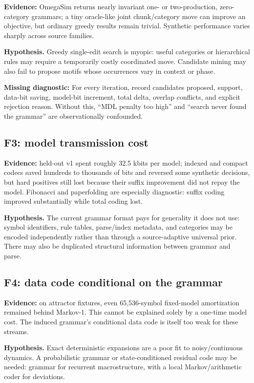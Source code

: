 \documentclass[10pt]{article}
\newcommand{\hyp}{\textbf{Hypothesis.}}
\begin{document}
\textbf{Evidence:} OmegaSim returns nearly invariant one- or two-production,
zero-category grammars; a tiny oracle-like joint chunk/category move can
improve an objective, but ordinary greedy results remain trivial. Synthetic
performance varies sharply across source families.

\hyp{} Greedy single-edit search is myopic: useful categories or hierarchical
rules may require a temporarily costly coordinated move. Candidate mining may
also fail to propose motifs whose occurrences vary in context or phase.

\textbf{Missing diagnostic:} For every iteration, record candidates proposed,
support, data-bit saving, model-bit increment, total delta, overlap conflicts,
and explicit rejection reason. Without this, ``MDL penalty too high'' and
``search never found the grammar'' are observationally confounded.

\subsection{F3: model transmission cost}

\textbf{Evidence:} held-out v1 spent roughly 32.5 kbits per model; indexed and
compact codecs saved hundreds to thousands of bits and reversed some synthetic
decisions, but hard positives still lost because their suffix improvement did
not repay the model. Fibonacci and paperfolding are especially diagnostic:
suffix coding improved substantially while total coding lost.

\hyp{} The current grammar format pays for generality it does not use:
symbol identifiers, rule tables, parse/index metadata, and categories may be
encoded independently rather than through a source-adaptive universal prior.
There may also be duplicated structural information between grammar and parse.

\subsection{F4: data code conditional on the grammar}

\textbf{Evidence:} on attractor fixtures, even 65,536-symbol fixed-model
amortization remained behind Markov-1. This cannot be explained solely by a
one-time model cost. The induced grammar's conditional data code is itself too
weak for these streams.

\hyp{} Exact deterministic expansions are a poor fit to noisy/continuous
dynamics. A probabilistic grammar or state-conditioned residual code may be
needed: grammar for recurrent macrostructure, with a local Markov/arithmetic
coder for deviations.
\end{document}
